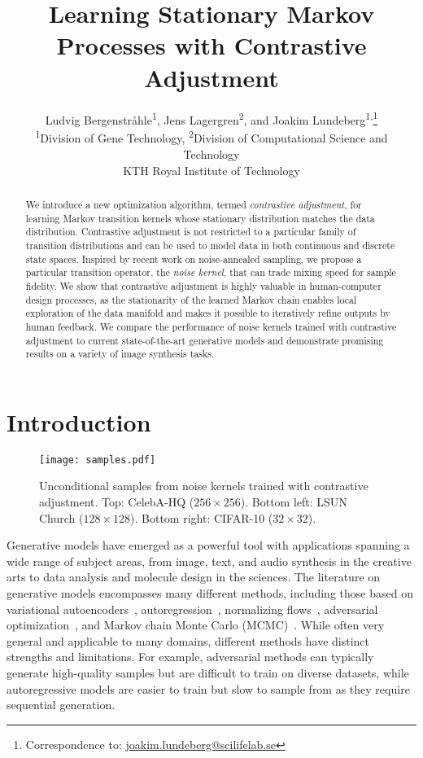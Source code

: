 \documentclass[10pt,twocolumn,letterpaper]{article}
\title{Learning Stationary Markov Processes with Contrastive Adjustment}
\author{
  Ludvig Bergenstråhle\textsuperscript{1},
  Jens Lagergren\textsuperscript{2}, and
  Joakim Lundeberg\textsuperscript{1,}\thanks{Correspondence to: \href{mailto:joakim.lundeberg@scilifelab.se}{joakim.lundeberg@scilifelab.se}}
  \\
  {\small
    \textsuperscript{1}Division of Gene Technology,
    \textsuperscript{2}Division of Computational Science and Technology
  }
  \\
  {\small KTH Royal Institute of Technology}
}
\begin{document}
\maketitle

\begin{abstract}
  We introduce a new optimization algorithm, termed \emph{contrastive adjustment}, for learning Markov transition kernels whose stationary distribution matches the data distribution.
  Contrastive adjustment is not restricted to a particular family of transition distributions and can be used to model data in both continuous and discrete state spaces.
  Inspired by recent work on noise-annealed sampling, we propose a particular transition operator, the \emph{noise kernel}, that can trade mixing speed for sample fidelity.
  We show that contrastive adjustment is highly valuable in human-computer design processes, as the stationarity of the learned Markov chain enables local exploration of the data manifold and makes it possible to iteratively refine outputs by human feedback.
  We compare the performance of noise kernels trained with contrastive adjustment to current state-of-the-art generative models and demonstrate promising results on a variety of image synthesis tasks.
\end{abstract}


\section{Introduction}

\begin{figure}[t]
  \centering
  \texttt{[image: samples.pdf]}\caption{
    Unconditional samples from noise kernels trained with contrastive adjustment.
    Top: CelebA-HQ ($256 \times 256$).
    Bottom left: LSUN Church ($128 \times 128$).
    Bottom right: CIFAR-10 ($32 \times 32$).
  }\label{fig:ca:samples}
\end{figure}

Generative models have emerged as a powerful tool with applications spanning a wide range of subject areas, from image, text, and audio synthesis in the creative arts to data analysis and molecule design in the sciences.
The literature on generative models encompasses many different methods, including those based on variational autoencoders~\cite{kingma2013auto}, autoregression~\cite{oord2016conditional}, normalizing flows~\cite{rezende2015variational}, adversarial optimization~\cite{goodfellow2014generative}, and Markov chain Monte Carlo (MCMC)~\cite{song2019generative}.
While often very general and applicable to many domains, different methods have distinct strengths and limitations.
For example, adversarial methods can typically generate high-quality samples but are difficult to train on diverse datasets, while autoregressive models are easier to train but slow to sample from as they require sequential generation.
\end{document}
